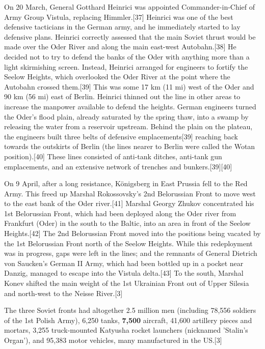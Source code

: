 On 20 March, General Gotthard Heinrici was appointed Commander-in-Chief of Army Group Vistula, replacing Himmler.[37] Heinrici was one of the best defensive tacticians in the German army, and he immediately started to lay defensive plans. Heinrici correctly assessed that the main Soviet thrust would be made over the Oder River and along the main east-west Autobahn.[38] He decided not to try to defend the banks of the Oder with anything more than a light skirmishing screen. Instead, Heinrici arranged for engineers to fortify the Seelow Heights, which overlooked the Oder River at the point where the Autobahn crossed them.[39] This was some 17 km (11 mi) west of the Oder and 90 km (56 mi) east of Berlin. Heinrici thinned out the line in other areas to increase the manpower available to defend the heights. German engineers turned the Oder's flood plain, already saturated by the spring thaw, into a swamp by releasing the water from a reservoir upstream. Behind the plain on the plateau, the engineers built three belts of defensive emplacements[39] reaching back towards the outskirts of Berlin (the lines nearer to Berlin were called the Wotan position).[40] These lines consisted of anti-tank ditches, anti-tank gun emplacements, and an extensive network of trenches and bunkers.[39][40]

On 9 April, after a long resistance, Königsberg in East Prussia fell to the Red Army. This freed up Marshal Rokossovsky's 2nd Belorussian Front to move west to the east bank of the Oder river.[41] Marshal Georgy Zhukov concentrated his 1st Belorussian Front, which had been deployed along the Oder river from Frankfurt (Oder) in the south to the Baltic, into an area in front of the Seelow Heights.[42] The 2nd Belorussian Front moved into the positions being vacated by the 1st Belorussian Front north of the Seelow Heights. While this redeployment was in progress, gaps were left in the lines; and the remnants of General Dietrich von Saucken's German II Army, which had been bottled up in a pocket near Danzig, managed to escape into the Vistula delta.[43] To the south, Marshal Konev shifted the main weight of the 1st Ukrainian Front out of Upper Silesia and north-west to the Neisse River.[3]

The three Soviet fronts had altogether 2.5 million men (including 78,556 soldiers of the 1st Polish Army), 6,250 tanks, \textbf{7,500} aircraft, 41,600 artillery pieces and mortars, 3,255 truck-mounted Katyusha rocket launchers (nicknamed 'Stalin's Organ'), and 95,383 motor vehicles, many manufactured in the US.[3] \thechapter